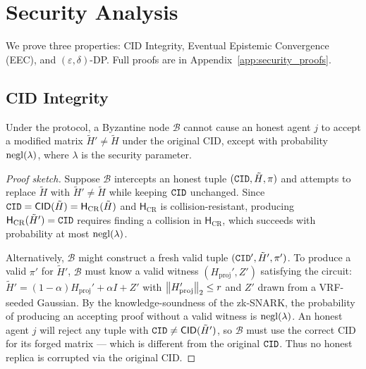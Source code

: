 \section{Security Analysis}
\label{sec:security}

We prove three properties: CID Integrity, Eventual Epistemic Convergence (EEC), and
$(\varepsilon,\delta)$-DP.  Full proofs are in Appendix~\ref{app:security_proofs}.

\subsection{CID Integrity}

\begin{theorem}
  \label{thm:cid_integrity}
  Under the \fedsink{} protocol, a Byzantine node $\mathcal{B}$ cannot cause an honest
  agent $j$ to accept a modified matrix $\tilde{H}' \neq \tilde{H}$ under the original
  CID, except with probability $\mathrm{negl}(\lambda)$, where $\lambda$ is the security
  parameter.
\end{theorem}

\begin{proof}[Proof sketch]
  Suppose $\mathcal{B}$ intercepts an honest tuple $(\mathtt{CID}, \tilde{H}, \pi)$ and attempts
  to replace $\tilde{H}$ with $\tilde{H}' \neq \tilde{H}$ while keeping $\mathtt{CID}$
  unchanged.  Since $\mathtt{CID} = \mathsf{CID}(\tilde{H}) = \mathsf{H}_{\mathrm{CR}}(\tilde{H})$
  and $\mathsf{H}_{\mathrm{CR}}$ is collision-resistant, producing
  $\mathsf{H}_{\mathrm{CR}}(\tilde{H}') = \mathtt{CID}$ requires finding a collision in
  $\mathsf{H}_{\mathrm{CR}}$, which succeeds with probability at most $\mathrm{negl}(\lambda)$.

  Alternatively, $\mathcal{B}$ might construct a fresh valid tuple
  $(\mathtt{CID}', \tilde{H}', \pi')$.  To produce a valid $\pi'$ for $\tilde{H}'$, $\mathcal{B}$
  must know a valid witness $(H_{\mathrm{proj}}', Z')$ satisfying the circuit:
  $\tilde{H}' = (1-\alpha)H_{\mathrm{proj}}' + \alpha I + Z'$ with
  $\left\|H_{\mathrm{proj}}'\right\|_2 \leq r$ and $Z'$ drawn from a VRF-seeded Gaussian.
  By the knowledge-soundness of the zk-SNARK, the probability of producing an accepting
  proof without a valid witness is $\mathrm{negl}(\lambda)$.  An honest agent $j$ will reject
  any tuple with $\mathtt{CID} \neq \mathsf{CID}(\tilde{H}')$, so $\mathcal{B}$ must use the
  correct CID for its forged matrix — which is different from the original $\mathtt{CID}$.
  Thus no honest replica is corrupted via the original CID.
\end{proof}

